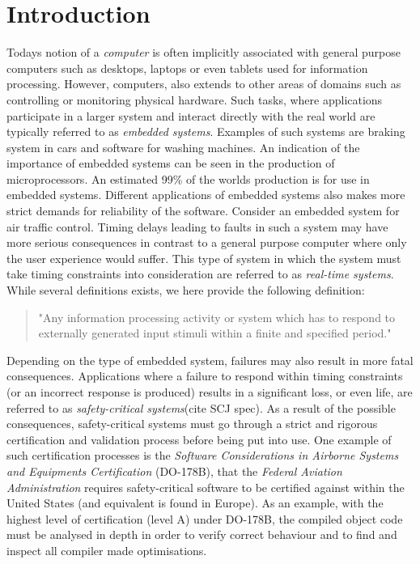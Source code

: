 \chapter{Introduction}
\label{chapter:introduction}
Todays notion of a \textit{computer} is often implicitly associated with general purpose computers such as desktops, laptops or even tablets used for information processing. However, computers, also extends to other areas of domains such as controlling or monitoring physical hardware. Such tasks, where applications participate in a larger system and interact directly with the real world are typically referred to as \textit{embedded systems}. Examples of such systems are braking system in cars and software for washing machines. An indication of the importance of embedded systems can be seen in the production of microprocessors. An estimated 99\% of the worlds production is for use in embedded systems\cite{alan2001real}. Different applications of embedded systems also makes more strict demands for reliability of the software. Consider an embedded system for air traffic control. Timing delays leading to faults in such a system may have more serious consequences in contrast to a general purpose computer where only the user experience would suffer. This type of system in which the system must take timing constraints into consideration are referred to as \textit{real-time systems}. While several definitions exists, we here provide the following definition:

\begin{quotation}
"Any information processing activity or system which has to respond to externally generated input stimuli within a finite and specified period." \cite{alan2001real}
\end{quotation}

Depending on the type of embedded system, failures may also result in more fatal consequences. Applications where a failure to respond within timing constraints (or an incorrect response is produced) results in a significant loss, or even life, are referred to as \textit{safety-critical systems}(cite SCJ spec). As a result of the possible consequences, safety-critical systems must go through a strict and rigorous certification and validation process before being put into use. One example of such certification processes is the \textit{Software Considerations in Airborne Systems and Equipments Certification} (DO-178B)\cite{DO178B}, that the \textit{Federal Aviation Administration} requires safety-critical software to be certified against within the United States (and equivalent is found in Europe). As an example, with the highest level of certification (level A) under DO-178B, the compiled object code must be analysed in depth in order to verify correct behaviour and to find and inspect all compiler made optimisations\cite{DO178B-Example}.


